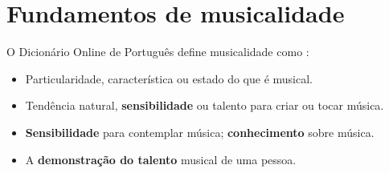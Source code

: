 
\chapter{Fundamentos de musicalidade}

\begin{definition}[Musicalidade:] 
\label{def:Musicalidade}
O Dicionário Online de Português define musicalidade como \cite{diciomusicalidade}:
\begin{itemize}
\item Particularidade, característica ou estado do que é musical.
\item Tendência natural, \textbf{sensibilidade} ou talento para criar ou tocar música.
\item \textbf{Sensibilidade} para contemplar música; \textbf{conhecimento} sobre música.
\item A \textbf{demonstração do talento} musical de uma pessoa.
\end{itemize}
\end{definition}













% 
% 


